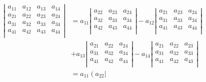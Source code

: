 \documentclass[12pt, letterpaper]{article}
\begin{document}
\begin{equation*}
    \begin{aligned}
        \left|
        \begin{matrix}
            a_{11} & a_{12} & a_{13} & a_{14} \\
            a_{21} & a_{22} & a_{23} & a_{24} \\
            a_{31} & a_{32} & a_{33} & a_{34} \\
            a_{41} & a_{42} & a_{43} & a_{44} \\
        \end{matrix}
        \right|
        & = a_{11}
            \left|
            \begin{matrix}
                a_{22} & a_{23} & a_{24} \\
                a_{32} & a_{33} & a_{34} \\
                a_{42} & a_{43} & a_{44} \\
            \end{matrix}
            \right|
        - a_{12}
            \left|
            \begin{matrix}
                a_{21} & a_{23} & a_{24} \\
                a_{31} & a_{33} & a_{34} \\
                a_{41} & a_{43} & a_{44} \\
            \end{matrix}
            \right|
        \\    
        & + a_{13}
            \left|
            \begin{matrix}
                a_{21} & a_{22} & a_{24} \\
                a_{31} & a_{32} & a_{34} \\
                a_{41} & a_{42} & a_{44} \\
            \end{matrix}
            \right|
        - a_{14}
            \left|
            \begin{matrix}
                a_{21} & a_{22} & a_{23} \\
                a_{31} & a_{32} & a_{33} \\
                a_{41} & a_{42} & a_{43} \\
            \end{matrix}
            \right|
        \\
        & = a_{11}
            \left(
                a_{22}
                \left|
                \begin{matrix}

\end{matrix}
\end{aligned}
\end{equation*}
\end{document}
